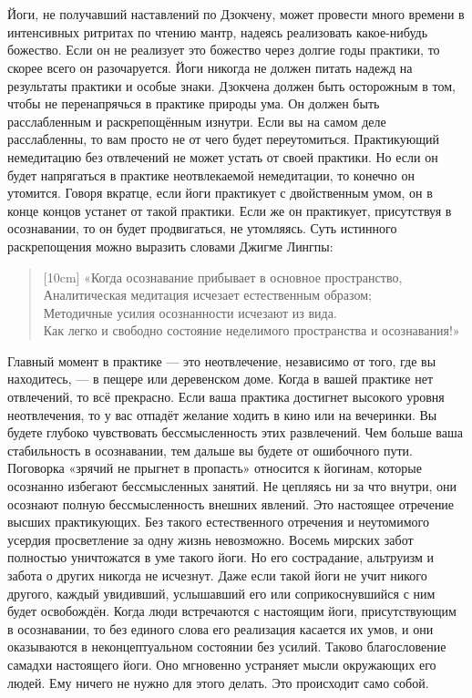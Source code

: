 \\ \\ Йоги, не получавший наставлений по Дзокчену, может провести много времени в интенсивных ритритах по чтению мантр, надеясь реализовать какое-нибудь божество. Если он не реализует это божество через долгие годы практики, то скорее всего он разочаруется. Йоги никогда не должен питать надежд на результаты практики и особые знаки. Дзокчена должен быть осторожным в том, чтобы не перенапрячься в практике природы ума. Он должен быть расслабленным и раскрепощённым изнутри. Если вы на самом деле расслаблен\-ны, то вам просто не от чего будет переутомиться. Практикую\-щий немедитацию без отвлечений не может устать от своей практики. Но если он будет напрягаться в практике неотвлекаемой немедитации, то конечно он утомится. Говоря вкратце, если йоги практикует с двойственным умом, он в конце концов устанет от такой практики. Если же он практикует, присутствуя в осознавании, то он будет продвигаться, не утомляясь. Суть истинного раскрепощения можно выразить словами Джигме Лингпы:
\begin{verse}[10cm]
«Когда осознавание прибывает в основное пространство, 
\\ Аналитическая медитация исчезает естественным образом; 
\\ Методичные усилия осознанности исчезают из вида. 
\\ Как легко и свободно состояние неделимого пространства и осознавания!»
\end{verse}
Главный момент в практике — это неотвлечение, независимо от того, где вы находитесь,
— в пещере или деревенском доме. Когда в вашей практике нет отвлечений,
то всё прекрасно. Если ваша практика достигнет высокого уровня неотвлечения,
то у вас отпадёт желание ходить в кино или на вечеринки. Вы будете глубоко
чувствовать бессмысленность этих развлече\-ний. Чем больше ваша стабильность
в осознавании, тем дальше вы будете от ошибочного пути. Поговорка «зрячий
не прыгнет в пропасть» относится к йогинам, которые осознанно избегают
бессмысленных занятий. Не цепляясь ни за что внутри, они осознают полную
бессмысленность внешних явле\-ний. Это настоящее отречение высших практикующих.
Без такого естественного отречения и неутомимого усердия просветление
за одну жизнь невозможно. Восемь мирских забот полностью уничтожатся
в уме такого йоги. Но его сострадание, альтруизм и забота о других
никогда не исчезнут. Даже если такой йоги не учит никого другого,
каждый увидивший, услышавший его или соприкоснувшийся с ним будет
освобож\-дён. Когда люди встречаются с настоящим йоги, присутствующим
в осознавании, то без единого слова его реализация касается их умов,
и они оказываются в неконцептуальном состоянии без усилий. Таково
благословение самадхи настояще\-го йоги. Оно мгновенно устраняет мысли
окружающих его людей. Ему ничего не нужно для этого делать.
Это происходит само собой.
\vspace{1cm}
